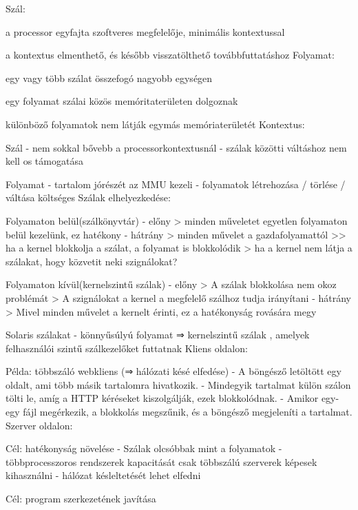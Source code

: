 \documentclass[12pt]{article}
\begin{document}
\begin{description}
        Szál:
    \item a processor egyfajta szoftveres megfelelője, minimális kontextussal
    \item a kontextus elmenthető, és később visszatölthető továbbfuttatáshoz 
        Folyamat:
    \item egy vagy több szálat összefogó nagyobb egységen
    \item egy folyamat szálai közös memóritaterületen dolgoznak
    \item különböző folyamatok nem látják egymás memóriaterületét
        Kontextus:
    \item Szál
        - nem sokkal bővebb a processorkontextusnál
        - szálak közötti váltáshoz nem kell os támogatása
    \item Folyamat
        - tartalom jórészét az MMU kezeli
        - folyamatok létrehozása / törlése / váltása költséges 
        Szálak elhelyezkedése:
    \item Folyamaton belül(szálkönyvtár)
        - előny
        > minden műveletet egyetlen folyamaton belül kezelünk, ez hatékony
        - hátrány
        > minden művelet a gazdafolyamattól >> ha a kernel blokkolja a szálat, a folyamat is blokkolódik
        > ha a kernel nem látja a szálakat, hogy közvetit neki szignálokat?
    \item Folyamaton kívül(kernelszintű szálak)
        - előny
        > A szálak blokkolása nem okoz problémát
        > A szignálokat a kernel a megfelelő szálhoz tudja irányítani
        - hátrány
        > Mivel minden művelet a kernelt érinti, ez a hatékonyság rovására megy
    \item Solaris szálakat
        - könnyűsúlyú folyamat ⇒ kernelszintű szálak , amelyek felhasználói szintű szálkezelőket futtatnak
        Kliens oldalon:
    \item Példa: többszáló webkliens (⇒ hálózati késé elfedése)
        - A böngésző letöltött egy oldalt, ami több másik tartalomra hivatkozik.
        - Mindegyik tartalmat külön szálon tölti le, amíg a HTTP kéréseket kiszolgálják, ezek blokkolódnak.
        - Amikor egy-egy fájl megérkezik, a blokkolás megszűnik, és a böngésző megjeleníti a tartalmat.
        Szerver oldalon:
    \item Cél: hatékonyság növelése
        - Szálak olcsóbbak mint a folyamatok
        - többprocesszoros rendszerek kapacitását csak többszálú szerverek képesek kihasználni
        - hálózat késleltetését lehet elfedni
    \item Cél: program szerkezetének javítása

\end{description}
\end{document}
